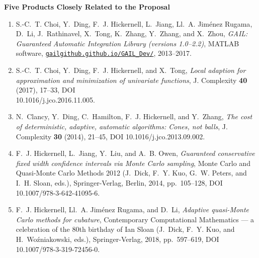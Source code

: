 \documentclass[11 pt]{NSFamsart}
\providecommand{\HickernellFJ}{Hickernell\xspace}
\begin{document}
\centerline{\textbf{Five Products Closely Related to the Proposal}}
\begin{enumerate} \renewcommand{\labelenumi}{[\arabic{enumi}]}

\item
S.-C.~T. Choi, Y.~Ding, F.~J. \HickernellFJ, L.~Jiang, {\relax Ll}.~A.
{Jim\'enez Rugama}, D.~Li, J.~Rathinavel, X.~Tong, K.~Zhang, Y.~Zhang, and
X.~Zhou, \emph{{GAIL}: {G}uaranteed {A}utomatic {I}ntegration {L}ibrary
	(versions 1.0--2.2)}, MATLAB software, \href{http://gailgithub.github.io/GAIL_Dev/} 
	{\nolinkurl{gailgithub.github.io/GAIL_Dev/}}, {2013--2017}.

\item S.-C.~T. Choi, Y.~Ding, F.~J. \HickernellFJ, and X.~Tong, \emph{Local adaption
	for approximation and minimization of univariate functions}, J. Complexity
\textbf{40} (2017), 17--33, {DOI} \\10.1016/j.jco.2016.11.005.

\item N.~Clancy, Y.~Ding, C.~Hamilton, F.~J. Hickernell, and Y.~Zhang, \emph{The cost
  of deterministic, adaptive, automatic algorithms: Cones, not balls}, J.
  Complexity \textbf{30} (2014), 21--45, {DOI} 10.1016/j.jco.2013.09.002.


 
\item F.~J. \HickernellFJ, L.~Jiang, Y.~Liu, and A.~B. Owen, \emph{Guaranteed conservative fixed width confidence intervals via {M}onte {C}arlo sampling}, {M}onte {C}arlo and Quasi-{M}onte {C}arlo Methods 2012 (J.~Dick, F.~Y. Kuo,
G.~W. Peters, and I.~H. Sloan, eds.), Springer-Verlag, Berlin, 2014, pp.~105--128,
 {DOI} 10.1007/978-3-642-41095-6.

\item
F.~J. \HickernellFJ, {\relax Ll}.~A. {Jim\'enez Rugama}, and D.~Li,
\emph{Adaptive quasi-{M}onte {C}arlo methods for cubature}, Contemporary
Computational Mathematics --- a celebration of the 80th birthday of {I}an
{S}loan (J.~Dick, F.~Y. Kuo, and H.~Wo\'zniakowski, eds.), Springer-Verlag,
2018, pp.~597--619, {DOI} 10.1007/978-3-319-72456-0.


  
  

\end{enumerate}
\end{document}
